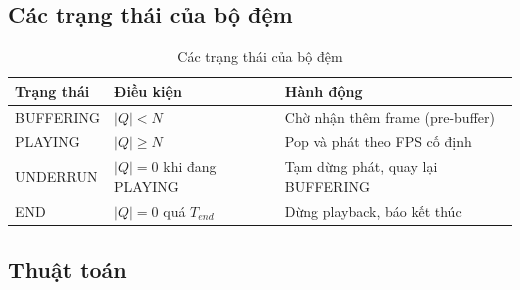 \subsection{Các trạng thái của bộ đệm}
\begin{table}[H]
\centering
\begin{tabular}{|l|l|l|}
\hline
\textbf{Trạng thái} & \textbf{Điều kiện} & \textbf{Hành động} \\ \hline
BUFFERING & $|Q| < N$ & Chờ nhận thêm frame (pre-buffer) \\ \hline
PLAYING & $|Q| \ge N$ & Pop và phát theo FPS cố định \\ \hline
UNDERRUN & $|Q|=0$ khi đang PLAYING & Tạm dừng phát, quay lại BUFFERING \\ \hline
END & $|Q|=0$ quá $T_{end}$ & Dừng playback, báo kết thúc \\ \hline
\end{tabular}
\caption{Các trạng thái của bộ đệm}
\end{table}

\subsection{Thuật toán}
